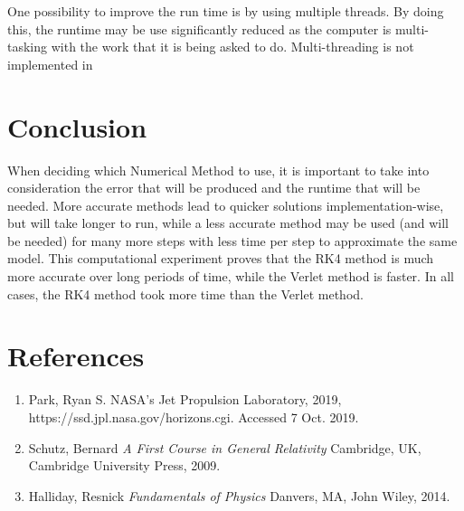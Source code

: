 \documentclass{article}
\begin{document}
\begin{multicols}{2}
One possibility to improve the run time is by using multiple threads. By doing this, the runtime may be use significantly reduced as the computer is multi-tasking with the work that it is being asked to do. Multi-threading is not implemented in 

\section{Conclusion}
When deciding which Numerical Method to use, it is important to take into consideration the error that will be produced and the runtime that will be needed. More accurate methods lead to quicker solutions implementation-wise, but will take longer to run, while a less accurate method may be used (and will be needed) for many more steps with less time per step to approximate the same model. This computational experiment proves that the RK4 method is much more accurate over long periods of time, while the Verlet method is faster. In all cases, the RK4 method took more time than the Verlet method.
\section{References}

\begin{enumerate}

\item Park, Ryan S. NASA's Jet Propulsion Laboratory, 2019, https://ssd.jpl.nasa.gov/horizons.cgi. Accessed 7 Oct. 2019.

\item Schutz, Bernard \textit{A First Course in General Relativity} Cambridge, UK, Cambridge University Press, 2009.

\item Halliday, Resnick \textit{Fundamentals of Physics} Danvers, MA, John Wiley, 2014.

\end{enumerate}

\end {multicols}
\end{document}
